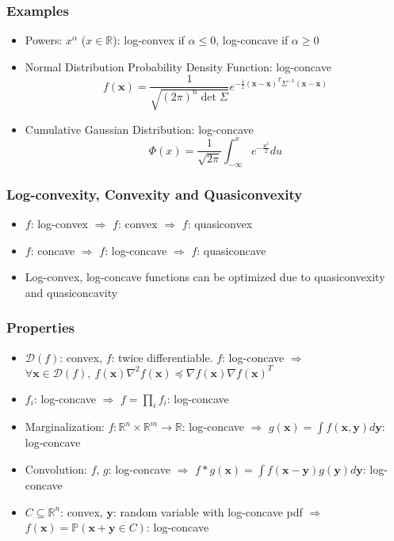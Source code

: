 \subsubsection*{Examples}
\begin{itemize}
    \item Powers: $x^{\alpha}$ ($x \in \mathbb{R}$): log-convex if $\alpha \leq 0$, log-concave if $\alpha \geq 0$
    \item Normal Distribution Probability Density Function: log-concave
    \begin{equation}
        f(\mathbf{x}) = \frac 1 {\sqrt{(2\pi)^n \det\Sigma}} e^{-\frac 1 2 \left(\mathbf{x} - \mathbf{\overline{x}}\right)^T \Sigma^{-1} \left(\mathbf{x} - \mathbf{\overline{x}}\right)}
    \end{equation}
    \item Cumulative Gaussian Distribution: log-concave
    \begin{equation}
        \Phi(x) = \frac 1 {\sqrt{2\pi}} \int_{-\infty}^x e^{-\frac {u^2} 2} du
    \end{equation}
\end{itemize}

\subsubsection*{Log-convexity, Convexity and Quasiconvexity}
\begin{itemize}
    \item $f$: log-convex $\Rightarrow$ $f$: convex $\Rightarrow$ $f$: quasiconvex
    \item $f$: concave $\Rightarrow$ $f$: log-concave $\Rightarrow$ $f$: quasiconcave
    \item Log-convex, log-concave functions can be optimized due to quasiconvexity and quasiconcavity
\end{itemize}

\subsubsection*{Properties}
\begin{itemize}
    \item $\mathcal{D}(f)$: convex, $f$: twice differentiable. $f$: log-concave $\Rightarrow$
        $\forall \mathbf{x} \in \mathcal{D}(f),~ f(\mathbf{x})\nabla^2f(\mathbf{x}) \preceq \nabla f(\mathbf{x}) \nabla f(\mathbf{x})^T$
    \item $f_i$: log-concave $\Rightarrow$ $f = \prod_{i} f_i$: log-concave
    \item Marginalization: $f:\mathbb{R}^n \times \mathbb{R}^m \rightarrow \mathbb{R}$: log-concave $\Rightarrow$
        $g(\mathbf{x}) = \int f(\mathbf{x}, \mathbf{y}) d\mathbf{y}$: log-concave
    \item Convolution: $f$, $g$: log-concave $\Rightarrow$ $f \ast g (\mathbf{x}) = \int f(\mathbf{x}-\mathbf{y})g(\mathbf{y})d\mathbf{y}$: log-concave
    \item $C \subseteq \mathbb{R}^n$: convex, $\mathbf{y}$: random variable with log-concave pdf
        $\Rightarrow$ $f(\mathbf{x}) = \mathbb{P}(\mathbf{x} + \mathbf{y} \in C)$: log-concave
\end{itemize}
